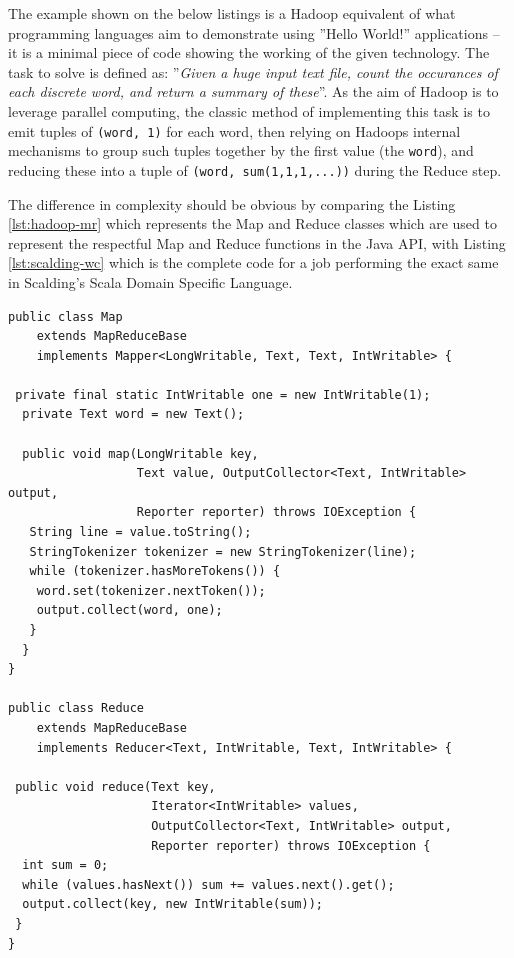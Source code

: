 The example shown on the below listings is a Hadoop equivalent of what programming languages aim to demonstrate using ''Hello World!'' applications -- it is a minimal piece of code showing the working of the given technology. The task to solve is defined as: ''\textit{Given a huge input text file, count the occurances of each discrete word, and return a summary of these}''. As the aim of Hadoop is to leverage parallel computing, the classic method of implementing this task is to emit tuples of \verb|(word, 1)| for each word, then relying on Hadoops internal mechanisms to group such tuples together by the first value (the \verb|word|), and reducing these into a tuple of \verb|(word, sum(1,1,1,...))| during the Reduce step.

The difference in complexity should be obvious by comparing the Listing \ref{lst:hadoop-mr} which represents the Map and Reduce classes which are used to represent the respectful Map and Reduce functions in the Java API, with Listing \ref{lst:scalding-wc} which is the complete code for a job performing the exact same in Scalding's Scala Domain Specific Language. 

\begin{lstlisting}[caption={Word Count example Job, implemented using plain Java Map Reduce API}, label={lst:hadoop-mr}]
public class Map 
    extends MapReduceBase 
    implements Mapper<LongWritable, Text, Text, IntWritable> {

 private final static IntWritable one = new IntWritable(1);
  private Text word = new Text();

  public void map(LongWritable key, 
                  Text value, OutputCollector<Text, IntWritable> output, 
                  Reporter reporter) throws IOException {
   String line = value.toString();
   StringTokenizer tokenizer = new StringTokenizer(line);
   while (tokenizer.hasMoreTokens()) {
    word.set(tokenizer.nextToken());
    output.collect(word, one);
   }
  }
}

public class Reduce 
    extends MapReduceBase 
    implements Reducer<Text, IntWritable, Text, IntWritable> {

 public void reduce(Text key, 
                    Iterator<IntWritable> values, 
                    OutputCollector<Text, IntWritable> output, 
                    Reporter reporter) throws IOException {
  int sum = 0;
  while (values.hasNext()) sum += values.next().get();
  output.collect(key, new IntWritable(sum));
 }
}
\end{lstlisting}


